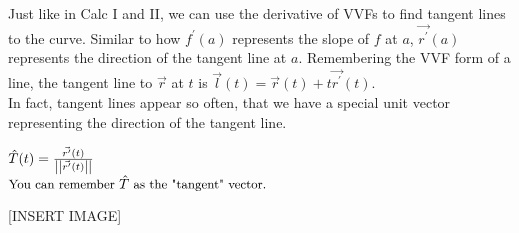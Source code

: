 \noindent
Just like in Calc I and II, we can use the derivative of VVFs to find tangent lines to the curve. Similar to how $f^{\prime}(a)$ represents the slope of $f$ at $a$, $\vec{r^\prime}(a)$ represents the direction of the tangent line at $a$. Remembering the VVF form of a line, the tangent line to $\vec{r}$ at $t$ is $\vec{l}(t)=\vec{r}(t)+t\vec{r^\prime}(t)$.\\
In fact, tangent lines appear so often, that we have a special unit vector representing the direction of the tangent line.
\begin{center}
	$\hat{T}(t)=\frac{\vec{r^\prime}(t)}{\left|\left|\vec{r^\prime}(t)\right|\right|}$\\
	$\small{\text{You can remember }\hat{T}\text{ as the "tangent" vector.}}$
\end{center}

[INSERT IMAGE]